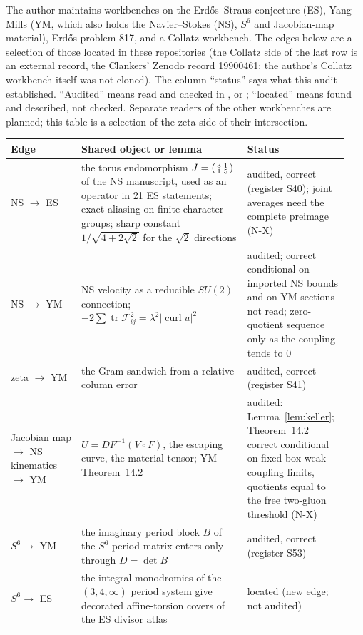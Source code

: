 The author maintains workbenches on the Erdős--Straus conjecture (ES), Yang--Mills (YM, which also holds the Navier--Stokes (NS), $S^6$ and Jacobian-map material), Erdős problem 817, and a Collatz workbench. The edges below are a selection of those located in these repositories (the Collatz side of the last row is an external record, the Clankers' Zenodo record 19900461; the author's Collatz workbench itself was not cloned). The column ``status'' says what this audit established. ``Audited'' means read and checked in ,  or ; ``located'' means found and described, not checked. Separate readers of the other workbenches are planned; this table is a selection of the zeta side of their intersection.

\begin{center}\small
\begin{longtable}{@{}p{0.2\linewidth}p{0.47\linewidth}p{0.27\linewidth}@{}}
\toprule
Edge & Shared object or lemma & Status\\
\midrule
\endhead
NS $\to$ ES & the torus endomorphism $J=\begin{psmallmatrix}3&1\\1&5\end{psmallmatrix}$ of the NS manuscript, used as an operator in 21 ES statements; exact aliasing on finite character groups; sharp constant $1/\sqrt{4+2\sqrt2}$ for the $\sqrt2$ directions & audited, correct (register S40); joint averages need the complete preimage (N-X)\\
NS $\to$ YM & NS velocity as a reducible $SU(2)$ connection; $-2\sum\operatorname{tr}\mathcal{F}_{ij}^2=\lambda^2|\operatorname{curl}u|^2$ & audited; correct conditional on imported NS bounds and on YM sections not read; zero-quotient sequence only as the coupling tends to $0$\\
zeta $\to$ YM & the Gram sandwich from a relative column error & audited, correct (register S41)\\
Jacobian map $\to$ NS kinematics $\to$ YM & $U=DF^{-1}(V\circ F)$, the escaping curve, the material tensor; YM Theorem~14.2 & audited: Lemma~\ref{lem:keller}; Theorem~14.2 correct conditional on fixed-box weak-coupling limits, quotients equal to the free two-gluon threshold (N-X)\\
$S^6\to$ YM & the imaginary period block $B$ of the $S^6$ period matrix enters only through $D=\det B$ & audited, correct (register S53)\\
$S^6\to$ ES & the integral monodromies of the $(3,4,\infty)$ period system give decorated affine-torsion covers of the ES divisor atlas & located (new edge; not audited)\\

\end{longtable}
\end{center}
